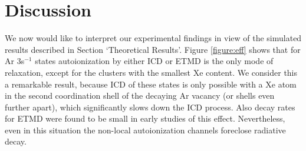 \documentclass[journal=jpccck,manuscript=article]{achemso}
\begin{document}
\section{Discussion
\label{sec:discussion}}
%
%
%
%
%
%
We now would like to interpret our experimental findings in view of the simulated results described in Section `Theoretical Results'.
Figure \ref{figure:eff} shows that for Ar 3s$^{-1}$ states autoionization by either ICD or ETMD is the only mode of relaxation, except for the clusters with the smallest Xe content.
We consider this a remarkable result, because ICD of these states is only possible with a Xe atom in the second coordination shell of the decaying Ar vacancy (or shells even further apart), which significantly slows down the ICD process.
Also decay rates for ETMD were found to be small in early studies of this effect.\cite{zobeley}
Nevertheless, even in this situation the non-local autoionization channels foreclose radiative decay.
\end{document}
